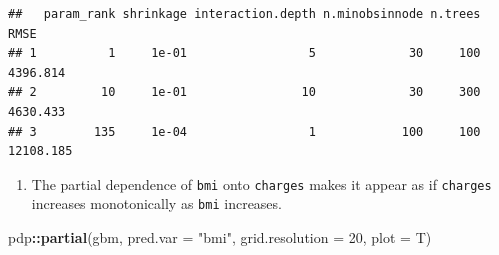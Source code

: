 \documentclass[openany]{book}
\newenvironment{Shaded}{\begin{snugshade}}{\end{snugshade}}
\newcommand{\DataTypeTok}[1]{\textcolor[rgb]{0.13,0.29,0.53}{#1}}
\newcommand{\DecValTok}[1]{\textcolor[rgb]{0.00,0.00,0.81}{#1}}
\newcommand{\KeywordTok}[1]{\textcolor[rgb]{0.13,0.29,0.53}{\textbf{#1}}}
\newcommand{\NormalTok}[1]{#1}
\newcommand{\OperatorTok}[1]{\textcolor[rgb]{0.81,0.36,0.00}{\textbf{#1}}}
\newcommand{\StringTok}[1]{\textcolor[rgb]{0.31,0.60,0.02}{#1}}
\providecommand{\tightlist}{%
  \setlength{\itemsep}{0pt}\setlength{\parskip}{0pt}}
\begin{document}
\begin{Shaded}
\end{Shaded}

\begin{verbatim}
##   param_rank shrinkage interaction.depth n.minobsinnode n.trees      RMSE
## 1          1     1e-01                 5             30     100  4396.814
## 2         10     1e-01                10             30     300  4630.433
## 3        135     1e-04                 1            100     100 12108.185
\end{verbatim}

\begin{enumerate}
\def\labelenumi{\arabic{enumi}.}
\setcounter{enumi}{2}
\tightlist
\item
  The partial dependence of \texttt{bmi} onto \texttt{charges} makes it appear as if \texttt{charges} increases monotonically as \texttt{bmi} increases.
\end{enumerate}

\begin{Shaded}
\begin{Highlighting}[]
\NormalTok{pdp}\OperatorTok{::}\KeywordTok{partial}\NormalTok{(gbm, }\DataTypeTok{pred.var =} \StringTok{"bmi"}\NormalTok{, }\DataTypeTok{grid.resolution =} \DecValTok{20}\NormalTok{, }\DataTypeTok{plot =}\NormalTok{ T)}
\end{Highlighting}
\end{Shaded}
\end{document}
